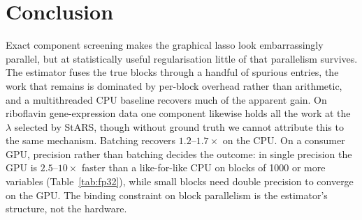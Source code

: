 \documentclass[pdflatex,sn-mathphys-num]{sn-jnl}
\begin{document}
\section{Conclusion}
Exact component screening makes the graphical lasso look embarrassingly
parallel, but at statistically useful regularisation little of that
parallelism survives. The estimator fuses the true blocks through a handful
of spurious entries, the work that remains is dominated by per-block overhead
rather than arithmetic, and a multithreaded CPU baseline recovers much of the
apparent gain. On riboflavin gene-expression data one component likewise holds
all the work at the $\lambda$ selected by StARS, though without ground truth we
cannot attribute this to the same mechanism. Batching recovers $1.2$--$1.7\times$ on the CPU. On a
consumer GPU, precision rather than batching decides the outcome: in single
precision the GPU is $2.5$--$10\times$ faster than a like-for-like CPU on
blocks of 1000 or more variables (Table~\ref{tab:fp32}), while small blocks need double precision to converge on the
GPU. The binding constraint on block parallelism is the
estimator's structure, not the hardware.

\end{document}

